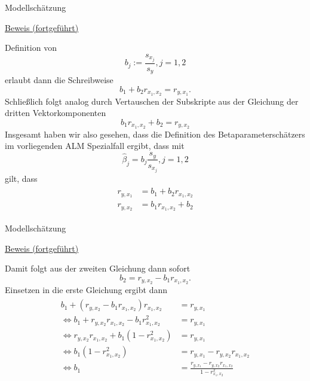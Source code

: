\documentclass[
  8pt,
  ignorenonframetext,
]{beamer}
\begin{document}
\begin{frame}{Modellschätzung}
\protect\hypertarget{modellschuxe4tzung-9}{}
\footnotesize

\underline{Beweis (fortgeführt)}

Definition von \begin{equation}\label{eq:sbeta}
b_j  := \frac{s_{x_j}}{s_{y}}, j = 1,2
\end{equation} erlaubt dann die Schreibweise \begin{equation}
b_1 + b_2 r_{x_1,x_2} = r_{y,x_1}.
\end{equation} Schließlich folgt analog durch Vertauschen der Subskripte
aus der Gleichung der dritten Vektorkomponenten \begin{equation}
b_1r_{x_1,x_2} + b_2  = r_{y,x_2}
\end{equation} Insgesamt haben wir also gesehen, dass die Definition des
Betaparameterschätzers im vorliegenden ALM Spezialfall ergibt, dass mit
\begin{equation}\label{eq:sbeta}
\hat{\beta}_j  = b_j \frac{s_{y}}{s_{x_j}}, j = 1,2
\end{equation} gilt, dass \begin{align}
\begin{split}
r_{y,x_1} & = b_1 + b_2 r_{x_1,x_2} \\
r_{y,x_2} & = b_1r_{x_1,x_2} + b_2
\end{split}
\end{align}
\end{frame}

\begin{frame}{Modellschätzung}
\protect\hypertarget{modellschuxe4tzung-10}{}
\footnotesize

\underline{Beweis (fortgeführt)}

Damit folgt aus der zweiten Gleichung dann sofort \begin{equation}
b_2 = r_{y,x_2} - b_1r_{x_1,x_2}.
\end{equation} Einsetzen in die erste Gleichung ergibt dann
\begin{align}
\begin{split}
b_1 + (r_{y,x_2} - b_1r_{x_1,x_2}) r_{x_1,x_2} & = r_{y,x_1}
\\
\Leftrightarrow
b_1 + r_{y,x_2}r_{x_1,x_2} - b_1r_{x_1,x_2}^2  & = r_{y,x_1}
\\
\Leftrightarrow
r_{y,x_2}r_{x_1,x_2} + b_1\left(1 - r_{x_1,x_2}^2\right) & = r_{y,x_1}
\\
\Leftrightarrow
b_1\left(1 - r_{x_1,x_2}^2\right) & = r_{y,x_1} -  r_{y,x_2}r_{x_1,x_2}
\\
\Leftrightarrow
b_1 & = \frac{r_{y,x_1} -  r_{y,x_2}r_{x_1,x_2}}{1 - r_{x_1,x_2}^2}
\end{split}
\end{align}
\end{frame}
\end{document}
